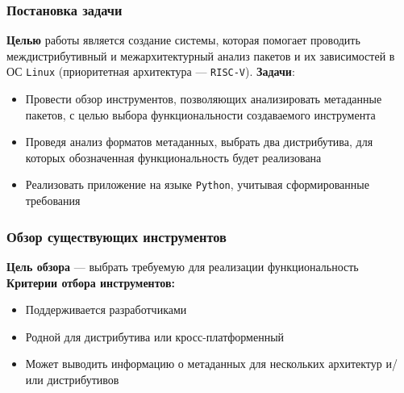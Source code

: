 \documentclass{beamer}
\begin{document}
\begin{frame}
	\frametitle{Постановка задачи}
	\textbf{Целью} работы является создание системы, которая помогает проводить междистрибутивный и межархитектурный анализ пакетов и их зависимостей в ОС \texttt{Linux} (приоритетная архитектура --- \texttt{RISC-V}).
	\newline
	\newline
	\textbf{Задачи}:
	\begin{itemize}
		\item Провести обзор инструментов, позволяющих анализировать метаданные пакетов, с целью выбора функциональности создаваемого инструмента
		\item Проведя анализ форматов метаданных, выбрать два дистрибутива, для которых обозначенная функциональность будет реализована
		\item Реализовать приложение на языке \texttt{Python}, учитывая сформированные требования
	\end{itemize}
\end{frame}

\begin{frame}
	\frametitle{Обзор существующих инструментов}
	\textbf{Цель обзора} --- выбрать требуемую для реализации функциональность
	\newline
	\newline
	\textbf{Критерии отбора инструментов:}
	\begin{itemize}
		\item Поддерживается разработчиками
		\item Родной для дистрибутива или кросс-платформенный
		\item Может выводить информацию о метаданных для нескольких архитектур и/или дистрибутивов
	\end{itemize}

\end{frame}
\end{document}
